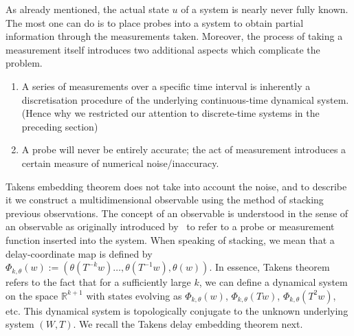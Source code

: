 
As already mentioned, the actual state $u$ of a system is nearly never fully known. The most one can do is to place probes into a system to obtain partial information through the measurements taken. Moreover, the process of taking a measurement itself introduces two additional aspects which complicate the problem. 
\vspace{-6mm}
\begin{enumerate}[noitemsep, label=\roman*.]
  \item A series of measurements over a specific time interval is inherently a discretisation procedure of the underlying continuous-time dynamical system. (Hence why we restricted our attention to discrete-time systems in the preceding section)
  \item A probe will never be entirely accurate; the act of measurement introduces a certain measure of numerical noise/inaccuracy.
\end{enumerate}

Takens embedding theorem does not take into account the noise, and to describe it we construct a multidimensional observable using the method of stacking previous observations.
The concept of an observable is understood in the sense of an observable as originally introduced by~\cite{takens1981detecting, genericObservableAeyels} to refer to a probe or measurement function inserted into the system. 
When speaking of stacking, we mean that a delay-coordinate map is defined by
$\Phi_{k,\theta}(w) := (\theta(T^{-k}w)\ldots,\theta(T^{-1}w),\theta(w))$.  
In essence, Takens theorem refers to the fact that for a sufficiently large $k$, we can define a dynamical system on the space $\mathbb{R}^{k+1}$ with states evolving as $\Phi_{k,\theta}(w)$, $\Phi_{k,\theta}(Tw)$, $\Phi_{k,\theta}(T^2w)$, etc. This dynamical system is topologically conjugate to the unknown underlying system $(W,T)$. We recall the Takens delay embedding theorem next.



